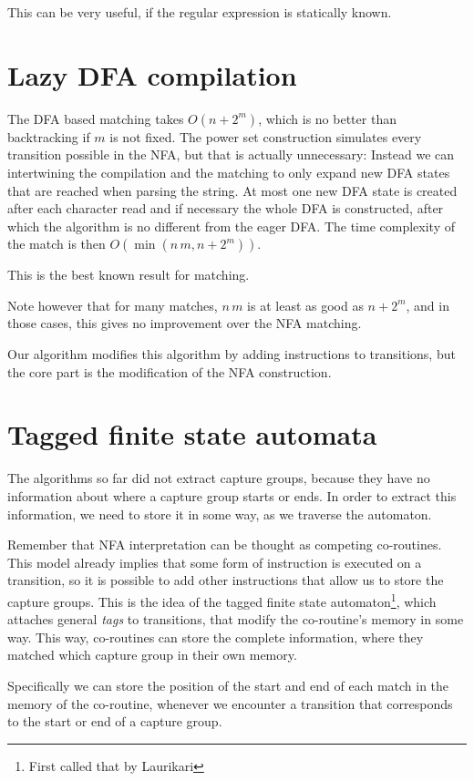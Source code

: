 \documentclass[11pt,a4paper,twoside,openright]{Thesis}
\theoremstyle{definition}
\newcommand{\seclabel}[1]{\label{sec:#1}}
\begin{document}
This can be very useful, if the regular expression is statically known.

\section{Lazy DFA compilation}\label{sec:lazy-dfa-match}
The DFA based matching takes $O(n + 2^m)$, which is no better than backtracking
if $m$ is not fixed. The power set construction simulates every transition
possible in the NFA, but that is actually unnecessary: Instead we can
intertwining the compilation and the matching to only expand new DFA states that
are reached when parsing the string. At most one new DFA state is created after
each character read and if necessary the whole DFA is constructed, after
which the algorithm is no different from the eager DFA\@. The time complexity of
the match is then $O(\min(n\, m, n+2^m))$.

This is the best known result for matching\cite{Cox07a,Cox09a,Cox10a}.

Note however that for many matches, $n\, m$ is at least as good as $n+2^m$, 
and in those cases, this gives no improvement over the NFA matching.

Our algorithm modifies this algorithm by adding instructions to transitions, 
but the core part is the modification of the NFA construction.

\section{Tagged finite state automata}\seclabel{tfsa}
The algorithms so far did not extract capture groups, because they have no
information about where a capture group starts or ends. In order to extract
this information, we need to store it in some way, as we traverse the
automaton.

Remember that NFA interpretation can be thought as competing co-routines.
This model already implies that some form of instruction is executed on a 
transition, so it is possible to add other instructions that allow us to 
store the capture groups.
This is the idea of the tagged finite state
automaton\footnote{First called that by Laurikari\cite{Laur00a}}, which
attaches general \emph{tags} to transitions, that modify the co-routine's
memory in some way. This way, co-routines can store the complete information,
where they matched which capture group in their own memory.

Specifically we can store the position of the start and end of each 
match in the memory of the co-routine, whenever we encounter a transition 
that corresponds to the start or end of a capture group. 
\end{document}
